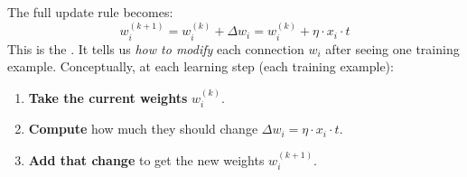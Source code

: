 The full update rule becomes:
\begin{equation}
    w_{i}^{(k+1)} = w_i^{(k)} + \Delta w_i = w_i^{(k)} + \eta \cdot x_i \cdot t
\end{equation}
This is the . It tells us \emph{how to modify} each connection $w_{i}$ after seeing one training example. Conceptually, at each learning step (each training example):
\begin{enumerate}
    \item \textbf{Take the current weights} $w_{i}^{(k)}$.
    \item \textbf{Compute} how much they should change $\Delta w_{i} = \eta \cdot x_{i} \cdot t$.
    \item \textbf{Add that change} to get the new weights $w_{i}^{(k+1)}$.
\end{enumerate}

